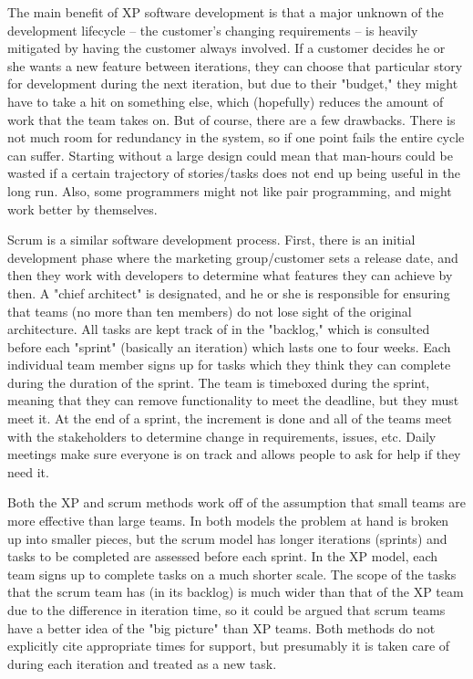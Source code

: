 \documentclass[12pt, letterpaper]{article}
\begin{document}
The main benefit of XP software development is that a major unknown of the development lifecycle -- the customer's changing requirements -- is heavily mitigated by having the customer always involved.
If a customer decides he or she wants a new feature between iterations, they can choose that particular story for development during the next iteration, but due to their "budget," they might have to take a hit on something else, which (hopefully) reduces the amount of work that the team takes on. But of course, there are a few drawbacks. There is not much room for redundancy in the system, so if one point fails the entire cycle can suffer. Starting without a large design could mean that man-hours could be wasted if a certain trajectory of stories/tasks does not end up being useful in the long run. Also, some programmers might not like pair programming, and might work better by themselves.

	Scrum \cite{rising00} is a similar software development process. First, there is an initial development phase where the marketing group/customer sets a release date, and then they work with developers to determine what features they can achieve by then. A "chief architect" is designated, and he or she is responsible for ensuring that teams (no more than ten members) do not lose sight of the original architecture. All tasks are kept track of in the "backlog," which is consulted before each "sprint" (basically an iteration) which lasts one to four weeks. Each individual team member signs up for tasks which they think they can complete during the duration of the sprint. The team is timeboxed during the sprint, meaning that they can remove functionality to meet the deadline, but they must meet it. At the end of a sprint, the increment is done and all of the teams meet with the stakeholders to determine change in requirements, issues, etc. Daily meetings make sure everyone is on track and allows people to ask for help if they need it.

Both the XP and scrum methods work off of the assumption that small teams are more effective than large teams.
In both models the problem at hand is broken up into smaller pieces, but the scrum model has longer iterations (sprints) and tasks to be completed are assessed before each sprint. In the XP model, each team signs up to complete tasks on a much shorter scale. The scope of the tasks that the scrum team has (in its backlog) is much wider than that of the XP team due to the difference in iteration time, so it could be argued that scrum teams have a better idea of the "big picture" than XP teams. Both methods do not explicitly cite appropriate times for support, but presumably it is taken care of during each iteration and treated as a new task.
\end{document}
